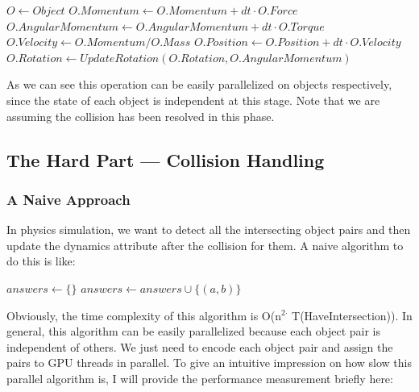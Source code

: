 \documentclass[11pt]{article}
\begin{document}
\begin{algorithm}[H]
\begin{algorithmic}[1]
\State $O \gets Object$
\State $O.Momentum \gets O.Momentum + dt\cdot O.Force$
\State $O.AngularMomentum \gets O.AngularMomentum + dt\cdot O.Torque$
\State $O.Velocity \gets O.Momentum/O.Mass$
\State $O.Position \gets O.Position + dt\cdot O.Velocity$
\State $O.Rotation \gets UpdateRotation(O.Rotation, O.AngularMomentum)$
\EndProcedure
\end{algorithmic}
\end{algorithm}

As we can see this operation can be easily parallelized on objects respectively, since the state of each object is independent at this stage. Note that we are assuming the collision has been resolved in this phase.

\subsection{The Hard Part --- Collision Handling}
\label{sec:orgd5a72f1}

\subsubsection{A Naive Approach}
\label{sec:orgfe8286c}
In physics simulation, we want to detect all the intersecting object pairs and then update the dynamics attribute after the collision for them. A naive algorithm to do this is like:

\begin{algorithm}
\begin{algorithmic}[1]
\State $answers \gets \{\}$
\State $answers \gets answers \cup \{(a, b)\}$
\EndIf
\EndFor
\State
\EndProcedure
\end{algorithmic}
\end{algorithm}

Obviously, the time complexity of this algorithm is O(n\(^{\text{2}\cdot}\) T(HaveIntersection)). In general, this algorithm can be easily parallelized because each object pair is independent of others. We just need to encode each object pair and assign the pairs to GPU threads in parallel. To give an intuitive impression on how slow this parallel algorithm is, I will provide the performance measurement briefly here:
\end{document}
